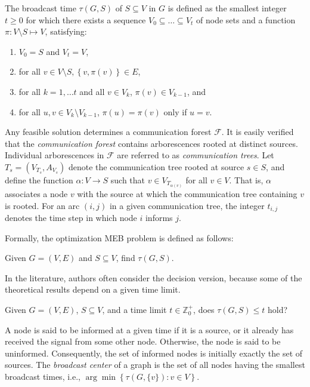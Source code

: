 \begin{definition}\label{def:mbt}
The broadcast time $\tau(G,S)$ of $S\subseteq V$ in $G$ is defined as the smallest integer $t\geq 0$
for which there exists a sequence $V_0\subseteq\dots\subseteq V_t$ of node sets and a function $\pi:V\setminus S\mapsto V$, satisfying:
\begin{enumerate}
\item $V_0=S$ and $V_t=V$,
\item for all $v\in V\setminus S, \left\{v,\pi(v)\right\}\in E$,
\item for all $k=1,\dots t$ and all $v\in V_k$, $\pi(v)\in V_{k-1}$, and
\item for all $u,v\in V_k\setminus V_{k-1}$, $\pi(u)=\pi(v)$ only if $u=v$.
\end{enumerate}
\end{definition}
Any feasible solution determines a communication forest $\mathcal{F}$.
It is easily verified that the \emph{communication forest} contains arborescences rooted at distinct sources.
Individual arborescences in $\mathcal{F}$ are referred to as \emph{communication trees}.
Let $T_s=\left(V_{T_s},A_{V_s}\right)$ denote the communication tree rooted at source $s\in S$, and define the function $\alpha:V\to S$ such that $v\in V_{T_{\alpha(v)}}$ for all $v\in V$.
That is, $\alpha$ associates a node $v$ with the source at which the communication tree containing $v$ is rooted.
For an arc $(i,j)$ in a given communication tree, the integer $t_{i,j}$ denotes the time step in which node $i$ informs $j$.

Formally, the optimization MEB problem is defined as follows:
\begin{problem}\label{mbt:opt}
Given $G=(V,E)$ and $S\subseteq V$, find $\tau(G,S)$. 
\end{problem}
In the literature, authors often consider the decision version, because some of the theoretical results depend on a given time limit.
\begin{problem}\label{mbt:dec}
Given $G=(V,E)$, $S\subseteq V$,  and a time limit $t\in \mathbb{Z}^+_0$, does $\tau(G,S)\leq t$ hold? 
\end{problem}
A node is said to be informed at a given time if it is a source, or it already has received the signal from some other node. Otherwise, the node is said to be uninformed.
Consequently, the set of informed nodes is initially exactly the set of sources.
The \emph{broadcast center} of a graph is the set of all nodes having the smallest broadcast times, i.e., $\arg\min\left\{\tau(G,\{v\}):v\in V\right\}$.


